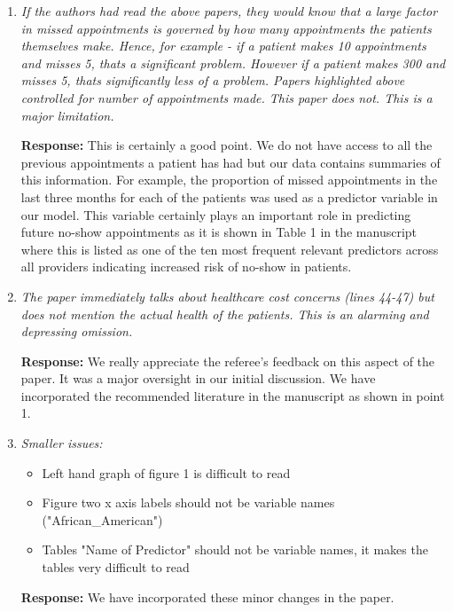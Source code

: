 \documentclass[11pt,a4paper,oneside]{article}
\begin{document}
\begin{enumerate}
\item {\em If the authors had read the above papers, they would know that a large factor in missed appointments is governed by how many appointments the patients themselves make.  Hence, for example - if a patient makes 10 appointments and misses 5, thats a significant problem.  However if a patient makes 300 and misses 5, thats significantly less of a problem.  Papers highlighted above controlled for number of appointments made.  This paper does not.  This is a major limitation.}

\vspace{12pt}

{\bf Response:} This is certainly a good point. We do not have access to all the previous appointments a patient has had but our data contains summaries of this information. For example, the proportion of missed appointments in the last three months for each of the patients was used as a predictor variable in our model. This variable certainly plays an important role in predicting future no-show appointments as it is shown in Table 1 in the manuscript where this is listed as one of the ten most frequent relevant predictors across all providers indicating increased risk of no-show in patients.

\item {\em The paper immediately talks about healthcare cost concerns (lines 44-47) but does not mention the actual health of the patients. This is an alarming and depressing omission.}

\vspace{12pt}

{\bf Response:} We really appreciate the referee's feedback on this aspect of the paper. It was a major oversight in our initial discussion. We have incorporated the recommended literature in the manuscript as shown in point 1.

\item {\em Smaller issues:
\begin{itemize}
\item Left hand graph of figure 1 is difficult to read

\item Figure two x axis labels should not be variable names ("African\_American") 

\item Tables "Name of Predictor" should not be variable names, it makes the tables very difficult to read
\end{itemize}
}

\vspace{12pt}

{\bf Response:} We have incorporated these minor changes in the paper.

\end{enumerate}
\end{document}
